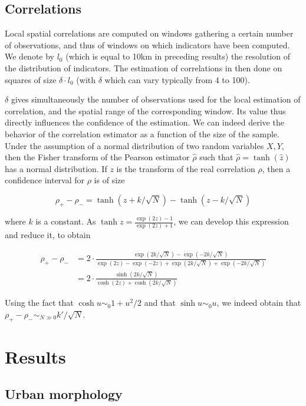 \subsection{Correlations}

Local spatial correlations are computed on windows gathering a certain number of observations, and thus of windows on which indicators have been computed. We denote by $l_0$ (which is equal to 10km in preceding results) the resolution of the distribution of indicators. The estimation of correlations in then done on squares of size $\delta\cdot l_0$ (with $\delta$ which can vary typically from 4 to 100).

$\delta$ gives simultaneously the number of observations used for the local estimation of correlation, and the spatial range of the corresponding window. Its value thus directly influences the confidence of the estimation. We can indeed derive the behavior of the correlation estimator as a function of the size of the sample. Under the assumption of a normal distribution of two random variables $X,Y$, then the Fisher transform of the Pearson estimator $\hat{\rho}$ such that $\hat{\rho} = \tanh (\hat{z})$ has a normal distribution. If $z$ is the transform of the real correlation $\rho$, then a confidence interval for $\rho$ is of size

\[
\rho_{+} - \rho_{-} = \tanh (z + k / \sqrt{N}) - \tanh (z - k / \sqrt{N})
\]

where $k$ is a constant. As $\tanh{z} = \frac{\exp (2z) - 1}{\exp (2z) + 1}$, we can develop this expression and reduce it, to obtain

\[
\begin{split}
	\rho_{+} - \rho_{-} & = 2\cdot \frac{\exp (2k/\sqrt{N})-\exp (-2k/\sqrt{N})}{\exp (2z)-\exp (-2z) + \exp (2k/\sqrt{N}) + \exp (-2k/\sqrt{N})}\\
	& = 2\cdot \frac{\sinh{(2k/\sqrt{N})}}{\cosh{(2z)} + \cosh{(2k/\sqrt{N})}}
\end{split}
\]

Using the fact that $\cosh u \sim_0 1 + u^2/2$ and that $\sinh u \sim_0 u$, we indeed obtain that $\rho_{+} - \rho_{-} \sim_{N\gg 0} k' / \sqrt{N}$.




\section{Results}

\subsection{Urban morphology}

